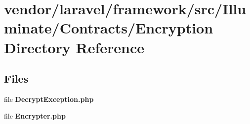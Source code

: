 \section{vendor/laravel/framework/src/\+Illuminate/\+Contracts/\+Encryption Directory Reference}
\label{dir_ca9c743efb85b4c86cf0bed6c88d4d6a}
\subsection*{Files}
\begin{DoxyCompactItemize}
\item 
file {\bf Decrypt\+Exception.\+php}
\item 
file {\bf Encrypter.\+php}
\end{DoxyCompactItemize}
